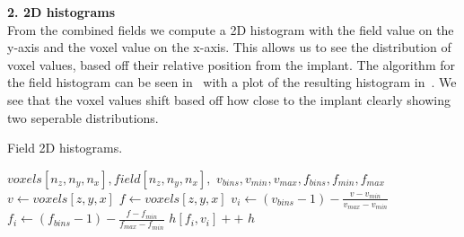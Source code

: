 \vspace{\baselineskip}
\noindent\textbf{2. 2D histograms} \\

From the combined fields we compute a 2D histogram with the field value on the y-axis and the voxel value on the x-axis. 
This allows us to see the distribution of voxel values, based off their relative position from the implant.
The algorithm for the field histogram can be seen in~ with a plot of the resulting histogram in~.
We see that the voxel values shift based off how close to the implant clearly showing two seperable distributions.

\begin{algorithm}
    \caption{Field 2D histograms.}
    \label{alg:field-hist}
    \begin{algorithmic}
         {$voxels[n_z,n_y,n_x], field[n_z,n_y,n_x],$ \newline $v_{bins}, v_{min}, v_{max}, f_{bins}, f_{min}, f_{max}$}
                \State $v \gets voxels[z,y,x]$
                    \State $f \gets voxels[z,y,x]$
                        \State $v_i \gets (v_{bins} - 1) - \frac{v - v_{min}}{v_{max} - v_{min}}$
                        \State $f_i \gets (f_{bins} - 1) - \frac{f - f_{min}}{f_{max} - f_{min}}$
                        \State $h[f_i,v_i]{+}{+}$
                    \EndIf
                \EndIf
            \EndFor
            \Return $h$
        \EndFunction
    \end{algorithmic}
\end{algorithm}

